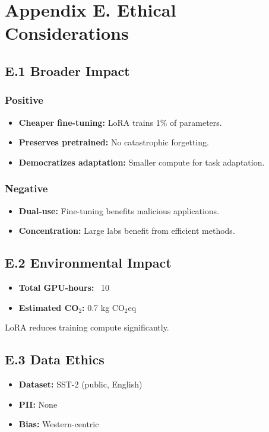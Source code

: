 
\section{Appendix E. Ethical Considerations}

\subsection{E.1 Broader Impact}

\subsubsection{Positive}
\begin{itemize}
\item \textbf{Cheaper fine-tuning:} LoRA trains 1\% of parameters.
\item \textbf{Preserves pretrained:} No catastrophic forgetting.
\item \textbf{Democratizes adaptation:} Smaller compute for task adaptation.

\end{itemize}
\subsubsection{Negative}
\begin{itemize}
\item \textbf{Dual-use:} Fine-tuning benefits malicious applications.
\item \textbf{Concentration:} Large labs benefit from efficient methods.

\end{itemize}
\subsection{E.2 Environmental Impact}

\begin{itemize}
\item \textbf{Total GPU-hours:} ~10
\item \textbf{Estimated CO$_2$:} 0.7 kg CO$_2$eq

\end{itemize}
LoRA reduces training compute significantly.

\subsection{E.3 Data Ethics}

\begin{itemize}
\item \textbf{Dataset:} SST-2 (public, English)
\item \textbf{PII:} None
\item \textbf{Bias:} Western-centric

\end{itemize}
